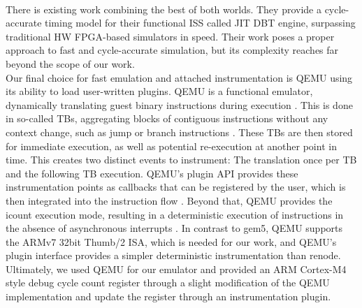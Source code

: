 \documentclass[english]{tudscrartcl}
\begin{document}
			\\
			There is existing work \cite{5642102} combining the best of both worlds.
			They provide a cycle-accurate timing model for their functional \ac{ISS} called JIT DBT engine, surpassing traditional \ac{HW} FPGA-based simulators in speed.
			Their work poses a proper approach to fast and cycle-accurate simulation, but its complexity reaches far beyond the scope of our work.
			\\
			Our final choice for fast emulation and attached instrumentation is QEMU \cite{QEMU-WebSite} using its ability to load user-written plugins.
			QEMU is a functional emulator, dynamically translating guest binary instructions during execution \cite{bellard2005qemu}.
			This is done in so-called \acp{TB}, aggregating blocks of contiguous instructions without any context change, such as jump or branch instructions \cite{bellard2005qemu}.
			These \acp{TB} are then stored for immediate execution, as well as potential re-execution at another point in time.
			This creates two distinct events to instrument: The translation once per \ac{TB} and the following \ac{TB} execution.
			QEMU's plugin API provides these instrumentation points as callbacks that can be registered by the user, which is then integrated into the instruction flow \cite{QEMU-WebSite}.
			Beyond that, QEMU provides the icount execution mode, resulting in a deterministic execution of instructions in the absence of asynchronous interrupts \cite{QEMU-WebSite}.
			In contrast to gem5, QEMU supports the ARMv7 32bit Thumb/2 ISA, which is needed for our work, and QEMU's plugin interface provides a simpler deterministic instrumentation than renode.
			\\
			Ultimately, we used QEMU for our emulator and provided an ARM Cortex-M4 style debug cycle count register through a slight modification of the QEMU implementation and update the register through an instrumentation plugin.
\end{document}
